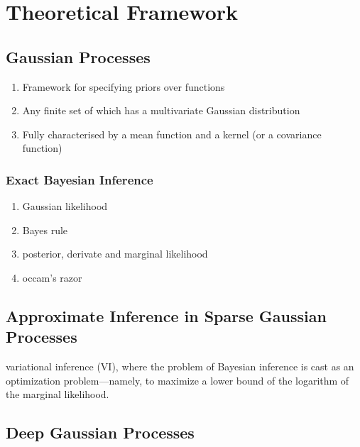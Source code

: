
\chapter{Theoretical Framework}
\label{chapter:theoretical-framework}

\section{Gaussian Processes}

\begin{enumerate}
  \item Framework for specifying priors over functions
  \item Any finite set of which has a multivariate Gaussian distribution
  \item Fully characterised by a mean function and a kernel (or a covariance function)
\end{enumerate}

\subsection{Exact Bayesian Inference}

\begin{enumerate}
  \item Gaussian likelihood
  \item Bayes rule
  \item posterior, derivate and marginal likelihood
  \item occam's razor
\end{enumerate}


\section{Approximate Inference in Sparse Gaussian Processes}
variational inference (VI), where the problem of Bayesian inference is cast as an optimization problem—namely, to maximize a lower bound of the logarithm of the marginal likelihood.


\section{Deep Gaussian Processes}

